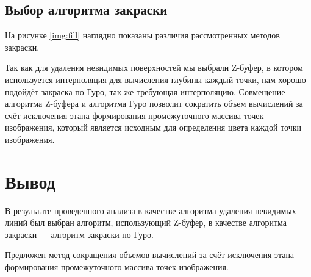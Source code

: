 \subsection{Выбор алгоритма закраски}

На рисунке \ref{img:fill} наглядно показаны различия рассмотренных методов закраски.


Так как для удаления невидимых поверхностей мы выбрали Z-буфер, в котором используется интерполяция для вычисления глубины каждый точки, нам хорошо подойдёт закраска по Гуро, так же требующая интерполяцию.
Совмещение алгоритма Z-буфера и алгоритма Гуро позволит сократить объем вычислений за счёт исключения этапа формирования промежуточного массива точек изображения, который является исходным для определения цвета каждой точки изображения.

\section*{Вывод}

В результате проведенного анализа в качестве алгоритма удаления невидимых линий был выбран алгоритм, использующий Z-буфер, в качестве алгоритма закраски — алгоритм закраски по Гуро.

Предложен метод сокращения объемов вычислений за счёт исключения этапа формирования промежуточного массива точек изображения.
